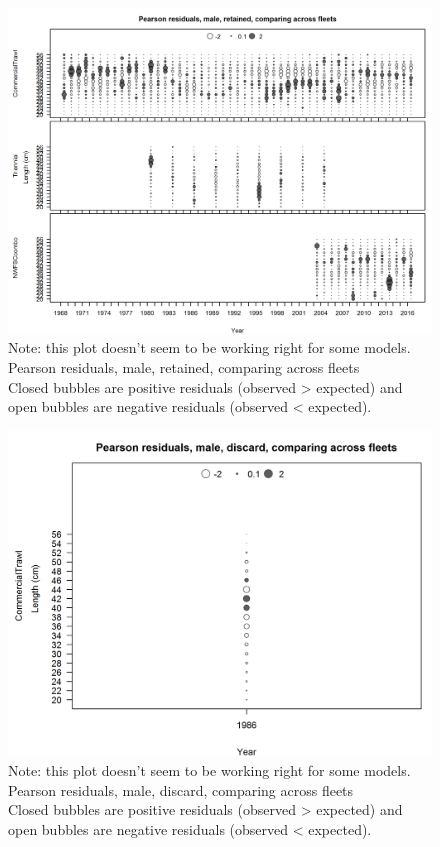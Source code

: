 \documentclass[12pt,]{article}
\begin{document}
\begin{figure}[htbp]
\centering
\includegraphics{./r4ss/plots_mod1/comp_lenfit_sex3mkt2_multi-fleet_comparison.png}
\caption{Note: this plot doesn't seem to be working right for some
models. Pearson residuals, male, retained, comparing across fleets\\
Closed bubbles are positive residuals (observed \textgreater{} expected)
and open bubbles are negative residuals (observed \textless{} expected).
\label{fig:mod1_36_comp_lenfit_sex3mkt2_multi-fleet_comparison}}
\end{figure}

\begin{figure}[htbp]
\centering
\includegraphics{./r4ss/plots_mod1/comp_lenfit_sex3mkt1_multi-fleet_comparison.png}
\caption{Note: this plot doesn't seem to be working right for some
models. Pearson residuals, male, discard, comparing across fleets\\
Closed bubbles are positive residuals (observed \textgreater{} expected)
and open bubbles are negative residuals (observed \textless{} expected).
\label{fig:mod1_37_comp_lenfit_sex3mkt1_multi-fleet_comparison}}
\end{figure}
\end{document}
